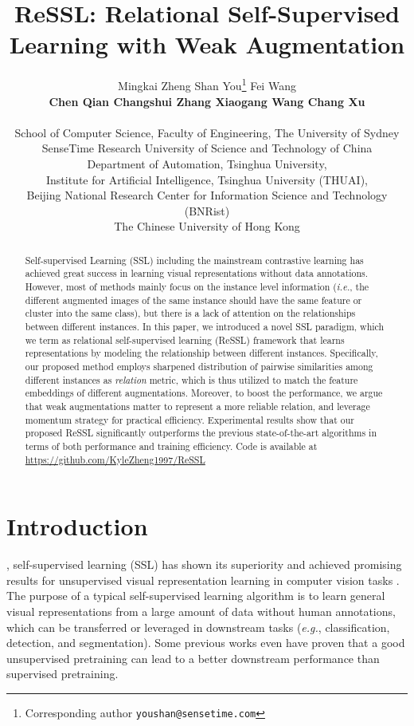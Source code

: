 \documentclass{article}
\title{ReSSL: Relational Self-Supervised Learning with Weak Augmentation}
\author{Mingkai Zheng \quad Shan You\thanks{Corresponding author \texttt{youshan@sensetime.com}}  \quad Fei Wang\\
	 \textbf{Chen Qian \quad Changshui Zhang \quad Xiaogang Wang \quad Chang Xu}\\
	 ~\\
	 School of Computer Science, Faculty of Engineering, The University of Sydney\\
	SenseTime Research \quad University of Science and Technology of China\\
	 Department of Automation, Tsinghua University,\\
Institute for Artificial Intelligence, Tsinghua University (THUAI), \\
Beijing National Research Center for Information Science and Technology (BNRist)\\
	 The Chinese University of Hong Kong\\ 
}
\newcommand{\<}{\left\langle}
\renewcommand{\>}{\right\rangle}
\newcommand{\eg}{{\emph{e.g.}}}
\newcommand{\ie}{{\emph{i.e.}}}
\begin{document}
\maketitle

\vspace{-10pt}
\begin{abstract}
\vspace{-10pt}

Self-supervised Learning (SSL) including the mainstream contrastive learning has achieved great success in learning visual representations without data annotations. However, most of methods mainly focus on the instance level information (\ie, the different augmented images of the same instance should have the same feature or cluster into the same class), but there is a lack of attention on the relationships between different instances. In this paper, we introduced a novel SSL paradigm, which we term as relational self-supervised learning  (ReSSL) framework that learns representations by modeling the relationship between different instances. Specifically, our proposed method employs sharpened distribution of pairwise similarities among different instances as \textit{relation} metric, which is thus utilized to match the feature embeddings of different augmentations. Moreover, to boost the performance, we argue that weak augmentations matter to represent a more reliable relation, and leverage momentum strategy for practical efficiency. Experimental results show that our proposed ReSSL significantly outperforms the previous state-of-the-art algorithms in terms of both performance and training efficiency. Code is available at \href{https://github.com/KyleZheng1997/ReSSL}{https://github.com/KyleZheng1997/ReSSL}



\end{abstract}

\ifCLASSOPTIONcompsoc
{}
\else
\section{Introduction}
\label{sec:introduction}
\fi

, self-supervised learning (SSL) has shown its superiority and achieved promising results for unsupervised visual representation learning in computer vision tasks \cite{cmc, deepinfomax, cpc, simclr, SimSiam, instance_discrimination, byol, moco}. The purpose of a typical self-supervised learning algorithm is to learn general visual representations from a large amount of data without human annotations, which can be transferred or leveraged in downstream tasks (\eg, classification, detection, and segmentation). Some previous works \cite{swav, byol} even have proven that a good unsupervised pretraining can lead to a better downstream performance than supervised pretraining.  
\end{document}
